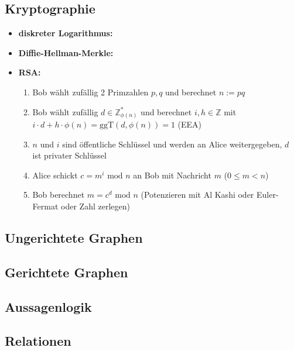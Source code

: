 \documentclass[10pt,a4paper]{article}
\begin{document}
\subsection{Kryptographie}
\begin{itemize}
\item \textbf{diskreter Logarithmus:} 
\item \textbf{Diffie-Hellman-Merkle:}
\item \textbf{RSA:}
\begin{enumerate}
\item Bob wählt zufällig 2 Primzahlen $p,q$ und berechnet $n:=pq$
\item Bob wählt zufällig $d\in \mathbb{Z}_{\phi(n)}^{*}$ und berechnet $i,h\in \mathbb{Z}$ mit $ i\cdot d+h\cdot \phi(n)=\text{ggT}(d,\phi(n))=1$ (EEA)


\item $n$ und $i$ sind öffentliche Schlüssel und werden an Alice weitergegeben, $d$ ist privater Schlüssel
\item Alice schickt $c=m^{i} \text{ mod } n$ an Bob mit Nachricht $m$ ($0\leq m <n$) 
\item Bob berechnet $m=c^{d} \text{ mod } n$ (Potenzieren mit Al Kashi oder Euler-Fermat oder Zahl zerlegen)
\end{enumerate}
\end{itemize}


\subsection{Ungerichtete Graphen}



\subsection{Gerichtete Graphen}



\subsection{Aussagenlogik}



\subsection{Relationen}
\end{document}
